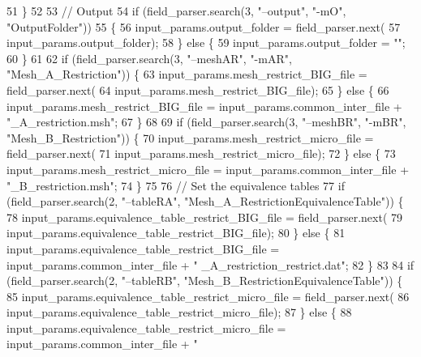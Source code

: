 \begin{DoxyCode}
51     \}
52 
53     \textcolor{comment}{// Output}
54     \textcolor{keywordflow}{if} (field\_parser.search(3, \textcolor{stringliteral}{"--output"}, \textcolor{stringliteral}{"-mO"}, \textcolor{stringliteral}{"OutputFolder"}))
55     \{
56         input\_params.output\_folder = field\_parser.next(
57             input\_params.output\_folder);
58     \} \textcolor{keywordflow}{else} \{
59         input\_params.output\_folder = \textcolor{stringliteral}{""};
60     \}
61 
62     \textcolor{keywordflow}{if} (field\_parser.search(3, \textcolor{stringliteral}{"--meshAR"}, \textcolor{stringliteral}{"-mAR"}, \textcolor{stringliteral}{"Mesh\_A\_Restriction"})) \{
63         input\_params.mesh\_restrict\_BIG\_file = field\_parser.next(
64                 input\_params.mesh\_restrict\_BIG\_file);
65     \} \textcolor{keywordflow}{else} \{
66         input\_params.mesh\_restrict\_BIG\_file = input\_params.common\_inter\_file + \textcolor{stringliteral}{"\_A\_restriction.msh"};
67     \}
68 
69     \textcolor{keywordflow}{if} (field\_parser.search(3, \textcolor{stringliteral}{"--meshBR"}, \textcolor{stringliteral}{"-mBR"}, \textcolor{stringliteral}{"Mesh\_B\_Restriction"})) \{
70         input\_params.mesh\_restrict\_micro\_file = field\_parser.next(
71                 input\_params.mesh\_restrict\_micro\_file);
72     \} \textcolor{keywordflow}{else} \{
73         input\_params.mesh\_restrict\_micro\_file = input\_params.common\_inter\_file + \textcolor{stringliteral}{"\_B\_restriction.msh"};
74     \}
75 
76     \textcolor{comment}{// Set the equivalence tables}
77     \textcolor{keywordflow}{if} (field\_parser.search(2, \textcolor{stringliteral}{"--tableRA"}, \textcolor{stringliteral}{"Mesh\_A\_RestrictionEquivalenceTable"})) \{
78         input\_params.equivalence\_table\_restrict\_BIG\_file = field\_parser.next(
79                 input\_params.equivalence\_table\_restrict\_BIG\_file);
80     \} \textcolor{keywordflow}{else} \{
81         input\_params.equivalence\_table\_restrict\_BIG\_file = input\_params.common\_inter\_file + \textcolor{stringliteral}{"
      \_A\_restriction\_restrict.dat"};
82     \}
83 
84     \textcolor{keywordflow}{if} (field\_parser.search(2, \textcolor{stringliteral}{"--tableRB"}, \textcolor{stringliteral}{"Mesh\_B\_RestrictionEquivalenceTable"})) \{
85         input\_params.equivalence\_table\_restrict\_micro\_file = field\_parser.next(
86                 input\_params.equivalence\_table\_restrict\_micro\_file);
87     \} \textcolor{keywordflow}{else} \{
88         input\_params.equivalence\_table\_restrict\_micro\_file = input\_params.common\_inter\_file + \textcolor{stringliteral}{"
}
\end{DoxyCode}
